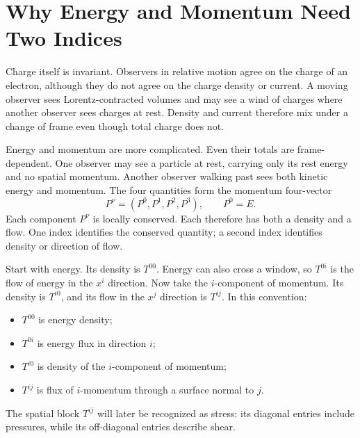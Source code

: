 \section{Why Energy and Momentum Need Two Indices}

Charge itself is invariant. Observers in relative motion agree on the charge
of an electron, although they do not agree on the charge density or current.
A moving observer sees Lorentz-contracted volumes and may see a wind of
charges where another observer sees charges at rest. Density and current
therefore mix under a change of frame even though total charge does not.

Energy and momentum are more complicated. Even their totals are
frame-dependent. One observer may see a particle at rest, carrying only its
rest energy and no spatial momentum. Another observer walking past sees both
kinetic energy and momentum. The four quantities form the momentum
four-vector
\begin{equation}
 P^\nu=(P^0,P^1,P^2,P^3),
 \qquad P^0=E.
\end{equation}
Each component \(P^\nu\) is locally conserved. Each therefore has both a
density and a flow. One index identifies the conserved quantity; a second
index identifies density or direction of flow.

Start with energy. Its density is \(T^{00}\). Energy can also cross a window,
so \(T^{0i}\) is the flow of energy in the \(x^i\) direction. Now take the
\(i\)-component of momentum. Its density is \(T^{i0}\), and its flow in the
\(x^j\) direction is \(T^{ij}\). In this convention:
\begin{itemize}
 \item \(T^{00}\) is energy density;
 \item \(T^{0i}\) is energy flux in direction \(i\);
 \item \(T^{i0}\) is density of the \(i\)-component of momentum;
 \item \(T^{ij}\) is flux of \(i\)-momentum through a surface normal to \(j\).
\end{itemize}
The spatial block \(T^{ij}\) will later be recognized as stress: its diagonal
entries include pressures, while its off-diagonal entries describe shear.

\begin{classroomqa}
\end{classroomqa}

